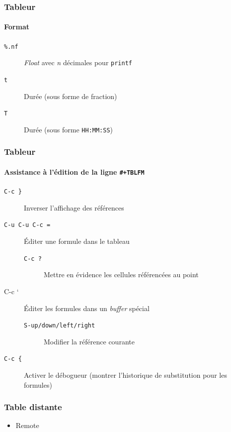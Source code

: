 \documentclass[presentation,t,hideothersubsections]{beamer}
\begin{document}
\begin{frame}
\frametitle{Tableur}
\framesubtitle{Format}
\label{sec-3-3-12}


\begin{description}
\item[\texttt{\%.nf}] \emph{Float} avec \emph{n} décimales pour \texttt{printf}
\item[\texttt{t}] Durée (sous forme de fraction)
\item[\texttt{T}] Durée (sous forme \texttt{HH:MM:SS})
\end{description}
\end{frame}
\begin{frame}
\frametitle{Tableur}
\framesubtitle{Assistance à l'édition de la ligne \texttt{\#+TBLFM}}
\label{sec-3-3-13}


\begin{description}
\item[\texttt{C-c \}}] Inverser l'affichage des références
\item[\texttt{C-u C-u C-c =}] Éditer une formule dans le tableau
\begin{description}
\item[\texttt{C-c ?}] Mettre en évidence les cellules référencées au point
\end{description}
\item[C-c `] Éditer les formules dans un \emph{buffer} spécial
\begin{description}
\item[\texttt{S-up/down/left/right}] Modifier la référence courante
\end{description}
\item[\texttt{C-c \{}] Activer le débogueur (montrer l'historique de substitution pour les
  formules)
\end{description}
\end{frame}
\begin{frame}
\frametitle{Table distante}
\label{sec-3-3-14}


\begin{itemize}
\item Remote
\end{itemize}
\end{frame}
\end{document}
